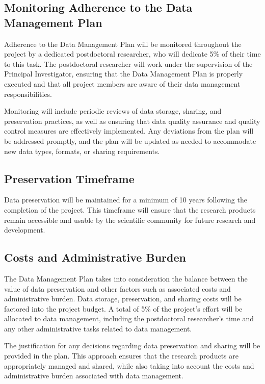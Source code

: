 \documentclass[onecolumn, compsoc,12pt]{IEEEtran}
\begin{document}
\subsection{Monitoring Adherence to the Data Management Plan}

Adherence to the Data Management Plan will be monitored throughout the project by a dedicated postdoctoral researcher, who will dedicate 5\% of their time to this task. The postdoctoral researcher will work under the supervision of the Principal Investigator, ensuring that the Data Management Plan is properly executed and that all project members are aware of their data management responsibilities.

Monitoring will include periodic reviews of data storage, sharing, and preservation practices, as well as ensuring that data quality assurance and quality control measures are effectively implemented. Any deviations from the plan will be addressed promptly, and the plan will be updated as needed to accommodate new data types, formats, or sharing requirements.

\subsection{Preservation Timeframe}

Data preservation will be maintained for a minimum of 10 years following the completion of the project. This timeframe will ensure that the research products remain accessible and usable by the scientific community for future research and development.
\subsection{Costs and Administrative Burden}

The Data Management Plan takes into consideration the balance between the value of data preservation and other factors such as associated costs and administrative burden. Data storage, preservation, and sharing costs will be factored into the project budget. A total of 5\% of the project's effort will be allocated to data management, including the postdoctoral researcher's time and any other administrative tasks related to data management.

The justification for any decisions regarding data preservation and sharing will be provided in the plan. This approach ensures that the research products are appropriately managed and shared, while also taking into account the costs and administrative burden associated with data management.
\end{document}
